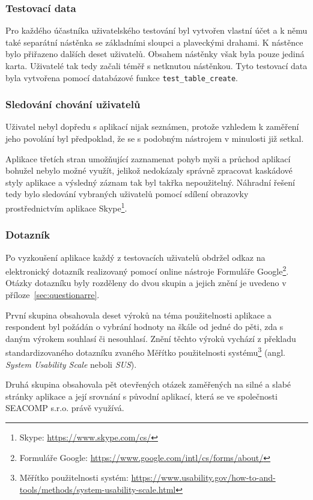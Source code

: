 \subsubsection{Testovací data}
Pro každého účastníka uživatelského testování byl vytvořen vlastní účet a k němu také separátní nástěnka se základními sloupci a plaveckými drahami. K nástěnce bylo přiřazeno dalších deset uživatelů. Obsahem nástěnky však byla pouze jediná karta. Uživatelé tak tedy začali téměř s netknutou nástěnkou. Tyto testovací data byla vytvořena pomocí databázové funkce \texttt{test\_table\_create}.

\subsubsection{Sledování chování uživatelů}
Uživatel nebyl dopředu s aplikací nijak seznámen, protože vzhledem k zaměření jeho povolání byl předpoklad, že se s podobným nástrojem v minulosti již setkal. 

Aplikace třetích stran umožňující zaznamenat pohyb myši a průchod aplikací bohužel nebylo možné využít, jelikož nedokázaly správně zpracovat kaskádové styly aplikace a výsledný záznam tak byl takřka nepoužitelný. Náhradní řešení tedy bylo sledování vybraných uživatelů pomocí sdílení obrazovky prostřednictvím aplikace Skype\footnote{Skype: \url{https://www.skype.com/cs/}}.

\subsubsection{Dotazník}
Po vyzkoušení aplikace každý z testovacích uživatelů obdržel odkaz na elektronický dotazník realizovaný pomocí online nástroje Formuláře Google\footnote{Formuláře Google: \url{https://www.google.com/intl/cs/forms/about/}}. Otázky dotazníku byly rozděleny do dvou skupin a jejich znění je uvedeno v příloze~\ref{sec:questionarre}.

První skupina obsahovala deset výroků na téma použitelnosti aplikace a respondent byl požádán o vybrání hodnoty na škále od jedné do pěti, zda s daným výrokem souhlasí či nesouhlasí. Znění těchto výroků vychází z překladu standardizovaného dotazníku zvaného Měřítko použitelnosti systému\footnote{Měřítko použitelnosti systém: \url{https://www.usability.gov/how-to-and-tools/methods/system-usability-scale.html}} (angl. \emph{System Usability Scale} neboli \emph{SUS}).

Druhá skupina obsahovala pět otevřených otázek zaměřených na silné a slabé stránky aplikace a její srovnání s původní aplikací, která se ve společnosti SEACOMP s.r.o. právě využívá.


